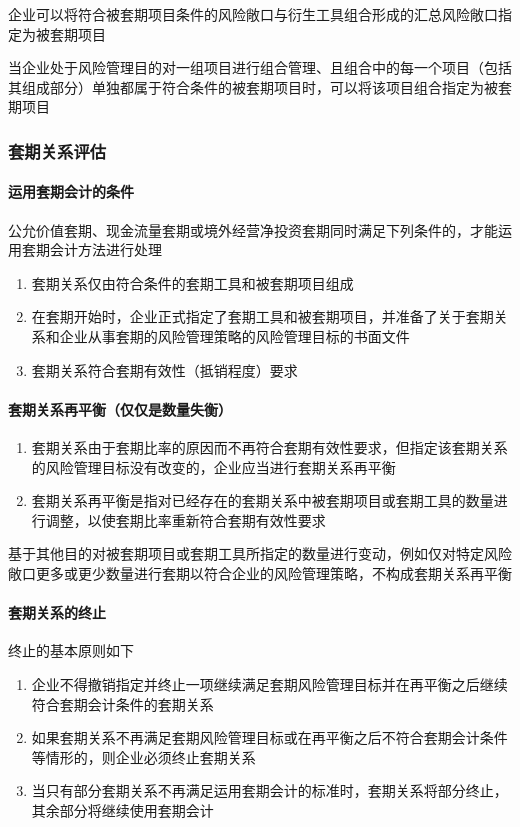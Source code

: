 \documentclass[UTF8,12pt]{ctexart}
\numberwithin{equation}{section} %
\numberwithin{figure}{section}
\numberwithin{table}{section}
\begin{document}
	企业可以将符合被套期项目条件的风险敞口与衍生工具组合形成的汇总风险敞口指定为被套期项目
	
	当企业处于风险管理目的对一组项目进行组合管理、且组合中的每一个项目（包括其组成部分）单独都属于符合条件的被套期项目时，可以将该项目组合指定为被套期项目
	
	
	\subsubsection{套期关系评估}
	\paragraph{运用套期会计的条件}
	公允价值套期、现金流量套期或境外经营净投资套期同时满足下列条件的，才能运用套期会计方法进行处理
	\begin{enumerate}
		\item 套期关系仅由符合条件的套期工具和被套期项目组成
		
		\item 在套期开始时，企业正式指定了套期工具和被套期项目，并准备了关于套期关系和企业从事套期的风险管理策略的风险管理目标的书面文件
		
		\item 套期关系符合套期有效性（抵销程度）要求
	\end{enumerate}

	\paragraph{套期关系再平衡（仅仅是数量失衡）}
	\begin{enumerate}
		\item 套期关系由于套期比率的原因而不再符合套期有效性要求，但指定该套期关系的风险管理目标没有改变的，企业应当进行套期关系再平衡
		
		\item 套期关系再平衡是指对已经存在的套期关系中被套期项目或套期工具的数量进行调整，以使套期比率重新符合套期有效性要求
	\end{enumerate}
	基于其他目的对被套期项目或套期工具所指定的数量进行变动，例如仅对特定风险敞口更多或更少数量进行套期以符合企业的风险管理策略，不构成套期关系再平衡
	
	\paragraph{套期关系的终止}
	终止的基本原则如下
	\begin{enumerate}
		\item 企业不得撤销指定并终止一项继续满足套期风险管理目标并在再平衡之后继续符合套期会计条件的套期关系
		
		\item 如果套期关系不再满足套期风险管理目标或在再平衡之后不符合套期会计条件等情形的，则企业必须终止套期关系
		
		\item 当只有部分套期关系不再满足运用套期会计的标准时，套期关系将部分终止，其余部分将继续使用套期会计
	\end{enumerate}
\end{document}
